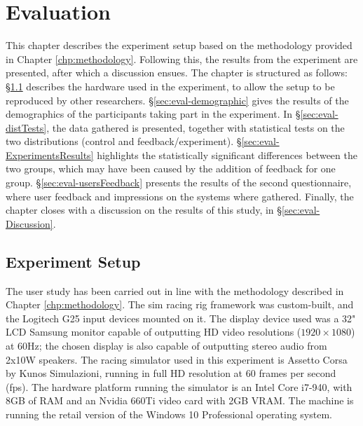 \chapter{Evaluation}
\label{eval}
\label{chp:evaluation}
This chapter describes the experiment setup based on the methodology provided in Chapter \ref{chp:methodology}. Following this, the results from the experiment are presented, after which a discussion ensues. The chapter is structured as follows: \S\ref{sec:eval-experiment} describes the hardware used in the experiment, to allow the setup to be reproduced by other researchers. \S\ref{sec:eval-demographic} gives the results of the demographics of the participants taking part in the experiment. In \S\ref{sec:eval-distTests}, the data gathered is presented, together with statistical tests on the two distributions (control and feedback/experiment). \S\ref{sec:eval-ExperimentsResults} highlights the statistically significant differences between the two groups, which may have been caused by the addition of feedback for one group. \S\ref{sec:eval-usersFeedback} presents the results of the second questionnaire, where user feedback and impressions on the systems where gathered. Finally, the chapter closes with a discussion on the results of this study, in \S\ref{sec:eval-Discussion}.


\section{Experiment Setup}
\label{sec:eval-experiment}
The user study has been carried out in line with the methodology described in  
Chapter \ref{chp:methodology}. The sim racing rig framework was custom-built, and the Logitech G25 input devices mounted on it. The display device used was a 32" LCD Samsung monitor capable of outputting HD video resolutions ($1920 \times 1080$) at 60Hz; the chosen display is also capable of outputting stereo audio from 2x10W speakers. The racing simulator used in this experiment is Assetto Corsa by Kunos Simulazioni, running in full HD resolution at 60 frames per second (fps). The hardware platform running the simulator is an Intel Core i7-940, with 8GB of RAM and an Nvidia 660Ti video card with 2GB VRAM. The machine is running the retail version of the Windows 10 Professional operating system.

